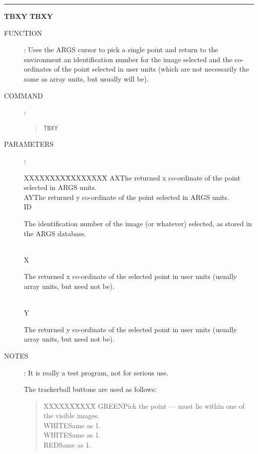 \goodbreak
\rule{\textwidth}{0.3mm}
{\Large {\bf TBXY} \hfill {\bf TBXY}}
\begin{description}
\item [FUNCTION]:
Uses the ARGS cursor to pick a single point and return to the environment an
identification number for the image selected and the co-ordinates of the point
selected in user units (which are not necessarily the same as array units, but
usually will be).
\item [COMMAND]:
\begin{quote}
{\tt TBXY}
\end{quote}
\item [PARAMETERS] :
\begin{tabbing}
XXXXXXXX\=XXXXXXXX\=\kill
AX\>\>The returned x co-ordinate of the point selected in ARGS units.\\
AY\>\>The returned y co-ordinate of the point selected in ARGS units.\\
ID\>\>\begin{minipage}[t]{100mm}
The identification number of the image (or whatever) selected, as stored in the
ARGS database.
\end{minipage}\\
X\>\>\begin{minipage}[t]{100mm}
The returned x co-ordinate of the selected point in user units (usually array
units, but need not be).
\end{minipage}\\
Y\>\>\begin{minipage}[t]{100mm}
The returned y co-ordinate of the selected point in user units (usually array
units, but need not be).
\end{minipage}
\end{tabbing}
\item [NOTES]:
It is really a test program, not for serious use.

The trackerball buttons are used as follows:
\begin{quote}
\begin{tabbing}
XXXXXX\=XXXX\=\kill
GREEN\>Pick the point --- must lie within one of the visible images.\\
WHITE\>Same as 1.\\
WHITE\>Same as 1.\\
RED\>Same as 1.
\end{tabbing}
\end{quote}
\end{description}

